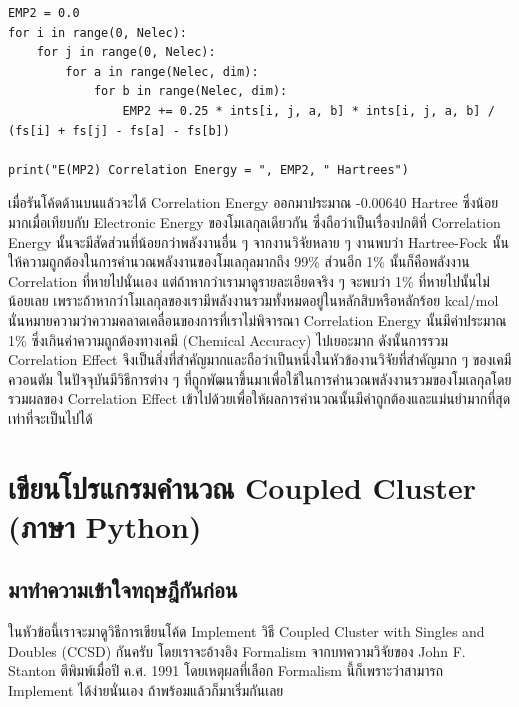 \vspace{5pt}

\begin{lstlisting}[style=MyPython]
EMP2 = 0.0
for i in range(0, Nelec):
    for j in range(0, Nelec):
        for a in range(Nelec, dim):
            for b in range(Nelec, dim):
                EMP2 += 0.25 * ints[i, j, a, b] * ints[i, j, a, b] / (fs[i] + fs[j] - fs[a] - fs[b])

print("E(MP2) Correlation Energy = ", EMP2, " Hartrees")
\end{lstlisting}

\vspace{5pt}

\noindent เมื่อรันโค้ดด้านบนแล้วจะได้ Correlation Energy ออกมาประมาณ -0.00640 Hartree ซึ่งน้อยมากเมื่อเทียบกับ Electronic
Energy ของโมเลกุลเดียวกัน ซึ่งถือว่าเป็นเรื่องปกติที่ Correlation Energy นั้นจะมีสัดส่วนที่น้อยกว่าพลังงานอื่น ๆ จากงานวิจัยหลาย ๆ งานพบว่า
Hartree-Fock นั้นให้ความถูกต้องในการคำนวณพลังงานของโมเลกุลมากถึง 99\% ส่วนอีก 1\% นั้นก็คือพลังงาน Correlation ที่หายไปนั่นเอง
แต่ถ้าหากว่าเรามาดูรายละเอียดจริง ๆ จะพบว่า 1\% ที่หายไปนั้นไม่น้อยเลย เพราะถ้าหากว่าโมเลกุลของเรามีพลังงานรวมทั้งหมดอยู่ในหลักสิบหรือหลักร้อย
kcal/mol นั่นหมายความว่าความคลาดเคลื่อนของการที่เราไม่พิจารณา Correlation Energy นั้นมีค่าประมาณ 1\% ซึ่งเกินค่าความถูกต้องทางเคมี
(Chemical Accuracy) ไปเยอะมาก ดังนั้นการรวม Correlation Effect จึงเป็นสิ่งที่สำคัญมากและถือว่าเป็นหนึ่งในหัวข้องานวิจัยที่สำคัญมาก ๆ
ของเคมีควอนตัม ในปัจจุบันมีวิธีการต่าง ๆ ที่ถูกพัฒนาขึ้นมาเพื่อใช้ในการคำนวณพลังงานรวมของโมเลกุลโดยรวมผลของ Correlation Effect
เข้าไปด้วยเพื่อให้ผลการคำนวณนั้นมีค่าถูกต้องและแม่นยำมากที่สุดเท่าที่จะเป็นไปได้

\section{เขียนโปรแกรมคำนวณ Coupled Cluster (ภาษา Python)}

\subsection{มาทำความเข้าใจทฤษฎีกันก่อน}

ในหัวข้อนี้เราจะมาดูวิธีการเขียนโค้ด Implement วิธี Coupled Cluster with Singles and Doubles (CCSD) กันครับ โดยเราจะอ้างอิง
Formalism จากบทความวิจัยของ John F. Stanton ตีพิมพ์เมื่อปี ค.ศ. 1991\autocite{stanton1991} โดยเหตุผลที่เลือก Formalism
นี้ก็เพราะว่าสามารถ Implement ได้ง่ายนั่นเอง ถ้าพร้อมแล้วก็มาเริ่มกันเลย


